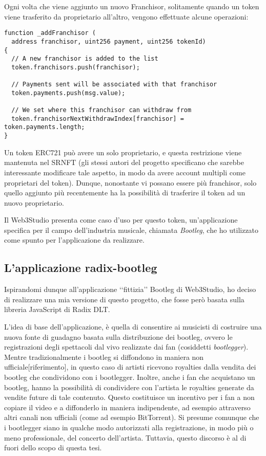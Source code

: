 Ogni volta che viene aggiunto un nuovo Franchisor, solitamente quando un token viene trasferito da proprietario all'altro, vengono effettuate alcune operazioni:

\begin{lstlisting}[language=Solidity,numbers=none]
function _addFranchisor (
  address franchisor, uint256 payment, uint256 tokenId)
{
  // A new franchisor is added to the list
  token.franchisors.push(franchisor);

  // Payments sent will be associated with that franchisor
  token.payments.push(msg.value);

  // We set where this franchisor can withdraw from
  token.franchisorNextWithdrawIndex[franchisor] = token.payments.length;
}
\end{lstlisting}

Un token ERC721 può avere un solo proprietario, e questa restrizione viene mantenuta nel SRNFT (gli stessi autori del progetto specificano che sarebbe interessante modificare tale aspetto, in modo da avere account multipli come proprietari del token). Dunque, nonostante vi possano essere più franchisor, solo quello aggiunto più recentemente ha la possibilità di trasferire il token ad un nuovo proprietario.

Il Web3Studio presenta come caso d'uso per questo token, un'applicazione specifica per il campo dell'industria musicale, chiamata \textit{Bootleg}, che ho utilizzato come spunto per l'applicazione da realizzare.

\subsection{L'applicazione radix-bootleg}
Ispirandomi dunque all'applicazione ‘‘fittizia’’ Bootleg di Web3Studio, ho deciso di realizzare una mia versione di questo progetto, che fosse però basata sulla libreria JavaScript di Radix DLT. 

L'idea di base dell'applicazione, è quella di consentire ai musicisti di costruire una nuova fonte di guadagno basata sulla distribuzione dei bootleg, ovvero le registrazioni degli spettacoli dal vivo realizzate dai fan (cosiddetti \textit{bootlegger}). Mentre tradizionalmente i bootleg si diffondono in maniera non ufficiale[riferimento], in questo caso di artisti ricevono royalties dalla vendita dei bootleg che condividono con i bootlegger. Inoltre, anche i fan che acquistano un bootleg, hanno la possibilità di condividere con l'artista le royalties generate da vendite future di tale contenuto. Questo costituisce un incentivo per i fan a non copiare il video e a diffonderlo in maniera indipendente, ad esempio attraverso altri canali non ufficiali (come ad esempio BitTorrent). Si presume comunque che i bootlegger siano in qualche modo autorizzati alla registrazione, in modo più o meno professionale, del concerto dell'artista. Tuttavia, questo discorso è al di fuori dello scopo di questa tesi.

